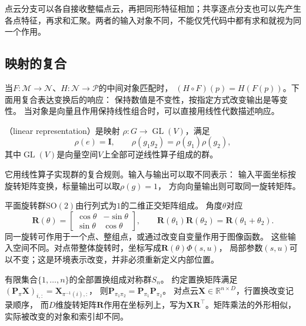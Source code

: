 点云分支可以各自接收整幅点云，再把同形特征相加；共享逐点分支也可以先产生
各点特征，再求和汇聚。两者的输入对象不同，不能仅凭代码中都有求和就视为同一个作用。

\subsection{映射的复合}
\label{sec:geometry-map-composition}
\label{sec:geometry-group-invariance-equivariance}


当$F:\mathcal M\to\mathcal N$、$H:\mathcal N\to\mathcal P$的中间对象匹配时，
$(H\circ F)(p)=H(F(p))$。下面用复合表达变换后的响应：
保持数值是不变性，按指定方式改变输出是等变性。
当对象是向量且作用保持线性组合时，可以直接用线性代数描述响应。
\begin{definition}[线性表示]
\label{def:geometry-linear-representation}
（linear representation）是映射
$\rho:G\to\operatorname{GL}(V)$，满足
\begin{equation}
 \rho(e)=\bm I,\qquad \rho(g_1g_2)=\rho(g_1)\rho(g_2),
 \label{eq:geometry-linear-representation}
\end{equation}
其中$\operatorname{GL}(V)$是向量空间$V$上全部可逆线性算子组成的群。
\end{definition}
它用线性算子实现群的复合规则。输入与输出可以取不同表示：
输入平面坐标按旋转矩阵变换，标量输出可以取$\rho(g)=1$，
方向向量输出则可取同一旋转矩阵。

平面旋转群$\mathrm{SO}(2)$由行列式为$1$的二维正交矩阵组成。
角度$\theta$对应
\begin{equation}
 \bm R(\theta)=
 \begin{bmatrix}\cos\theta&-\sin\theta\\\sin\theta&\cos\theta\end{bmatrix},
 \qquad
 \bm R(\theta_1)\bm R(\theta_2)=\bm R(\theta_1+\theta_2).
 \label{eq:geometry-planar-rotation-group}
\end{equation}
同一旋转可作用于一个点、整组点，或通过改变自变量作用于图像函数。
这些输入空间不同。对点带整体旋转时，坐标写成$\bm R(\theta)\Phi(s,u)$，
局部参数$(s,u)$可以不变；这是环境表示改变，并非必须重新定义内部位置。

有限集合$\{1,\ldots,n\}$的全部置换组成对称群$S_n$。
约定置换矩阵满足$(\bm P_\pi\bm X)_{i,:}=\bm X_{\pi^{-1}(i),:}$，
则$\bm P_{\pi_1\pi_2}=\bm P_{\pi_1}\bm P_{\pi_2}$。
对点云$\bm X\in\mathbb R^{n\times D}$，行置换改变记录顺序，
而$D$维旋转矩阵$\bm R$作用在坐标列上，写为$\bm X\bm R^\top$。矩阵乘法的外形相似，
实际被改变的对象和索引却不同。


